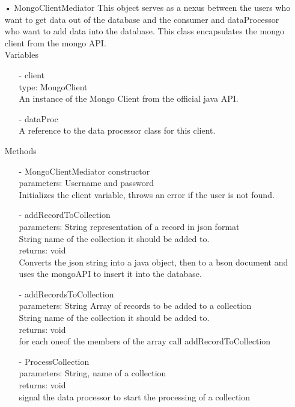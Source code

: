 \documentclass[oneside, english, final]{design}
\begin{document}
\begin{itemize}
	\item[•]MongoClientMediator
	      This object serves as a nexus between the users who want to get data out of the database and the consumer and dataProcessor who want to add data into the database. This class encapsulates the mongo client from the mongo API.
	      \\Variables
	      \begin{itemize}
		      \item[-] client
		            \\type: MongoClient
		            \\ An instance of the Mongo Client from the official java API.
		      \item[-] dataProc
		            \\ A reference to the data processor class for this client.
	      \end{itemize}
	      Methods
	      \begin{itemize}
		      \item[-]MongoClientMediator constructor
		            \\parameters: Username and password
		            \\Initializes the client variable, throws an error if the user is not found.

		      \item[-]addRecordToCollection
		            \\parameters: String representation of a record in json format
		            \\String name of the collection it should be added to.
		            \\returns: void
		            \\Converts the json string into a java object, then to a bson document and uses the mongoAPI to insert it into the database.

		      \item[-]addRecordsToCollection
		            \\parameters: String Array of records to be added to a collection
		            \\String name of the collection it should be added to.
		            \\returns: void
		            \\for each oneof the members of the array call addRecordToCollection

		      \item[-]ProcessCollection
		            \\parameters: String, name of a collection
		            \\returns: void
		            \\signal the data processor to start the processing of a collection


\end{itemize}
\end{itemize}
\end{document}
